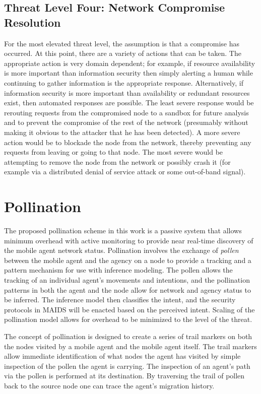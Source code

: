 \documentclass{acm_proc_article-sp}
\begin{document}
\subsection{Threat Level Four: Network Compromise Resolution}
For the most elevated threat level, the assumption is that a compromise has occurred.  At this point, there are a variety of actions that can be taken.  The appropriate action is very domain dependent; for example, if resource availability is more important than information security then simply alerting a human while continuing to gather information is the appropriate response.  Alternatively, if information security is more important than availability or redundant resources exist, then automated responses are possible.  The least severe response would be rerouting requests from the compromised node to a sandbox for future analysis and to prevent the compromise of the rest of the network (presumably without making it obvious to the attacker that he has been detected).  A more severe action would be to blockade the node from the network, thereby preventing any requests from leaving or going to that node.  The most severe would be attempting to remove the node from the network or possibly crash it (for example via a distributed denial of service attack or some out-of-band signal).

\section{Pollination}
The proposed pollination scheme in this work is a passive system that allows minimum overhead with active monitoring to provide near real-time discovery of the mobile agent network status.  Pollination involves the exchange of {\it pollen} between the mobile agent and the agency on a node to provide a tracking and a pattern mechanism for use with inference modeling.  The pollen allows the tracking of an individual agent's movements and intentions, and the pollination patterns in both the agent and the node allow for network and agency status to be inferred.  The inference model then classifies the intent, and the security protocols in MAIDS will be enacted based on the perceived intent.  Scaling of the pollination model allows for overhead to be minimized to the level of the threat.

The concept of pollination is designed to create a series of trail markers on both the nodes visited by a mobile agent and the mobile agent itself.  The trail markers allow immediate identification of what nodes the agent has visited by simple inspection of the pollen the agent is carrying.  The inspection of an agent's path via the pollen is performed at its destination.  By traversing the trail of pollen back to the source node one can trace the agent's migration history.
\end{document}

